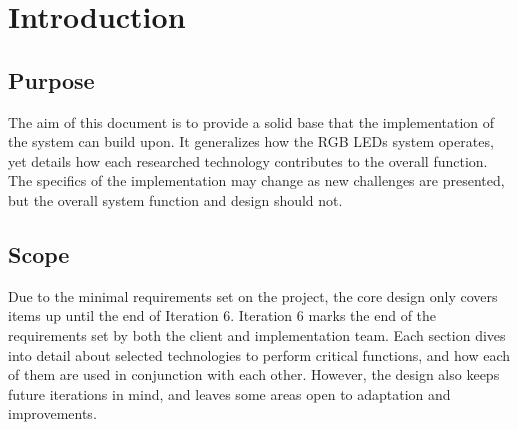 \documentclass[onecolumn, draftclsnofoot,10pt, compsoc]{IEEEtran}
\begin{document}

	\section{Introduction}

		\subsection{Purpose}
		The aim of this document is to provide a solid base that the implementation of the system can build upon. It generalizes how the RGB LEDs system
		operates, yet details how each researched technology contributes to the overall function. The specifics of the implementation may change as new
		challenges are presented, but the overall system function and design should not.

		\subsection{Scope}
		Due to the minimal requirements set on the project, the core design only covers items up until the end of Iteration 6. Iteration 6 marks the end of the
		requirements set by both the client and implementation team. Each section dives into detail	about selected technologies to perform critical functions,
		and how each of them are used in conjunction with each other. However, the design also keeps future iterations in mind, and leaves some areas open to
		adaptation and improvements.
\end{document}
